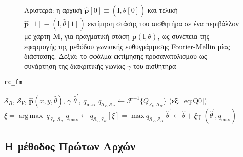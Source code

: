 \begin{figure}[h]\centering
  \vspace{0.5cm}
  
  \vspace{0.5cm}
  \caption{\small Αριστερά: η αρχική
           $\hat{\bm{p}}[0] \equiv (\bm{l},\hat{\theta}[0])$ και τελική
           $\hat{\bm{p}}[1] \equiv (\bm{l},\hat{\theta}[1])$ εκτίμηση στάσης του
           αισθητήρα σε ένα περιβάλλον με χάρτη $\bm{M}$, για πραγματική στάση
           $\bm{p}(\bm{l},\theta)$, ως συνέπεια της εφαρμογής της μεθόδου
           γωνιακής ευθυγράμμισης Fourier-Mellin μίας διάστασης. Δεξιά: το
           σφάλμα εκτίμησης προσανατολισμού ως συνάρτηση της διακριτικής γωνίας
           $\gamma$ του αισθητήρα}
  \label{fig:02_04_02:rc_fm}
\end{figure}

\begin{algorithm}
  \caption{\texttt{rc\_fm}}
  \begin{spacing}{1.3}
  \begin{algorithmic}[1]
    \REQUIRE $\mathcal{S}_R$, $\mathcal{S}_V$, $\hat{\bm{p}}(x, y, \hat{\theta})$, $\gamma$
    \ENSURE $\hat{\theta}^\prime$, $q_{\max}$
    \STATE $q_{\mathcal{S}_V, \mathcal{S}_R} \leftarrow \mathcal{F}^{-1}\{Q_{\mathcal{S}_V, \mathcal{S}_R}\}$ (εξ. \ref{eq:Q0})
    \STATE $\xi = \operatorname*{arg\,max} \ q_{\mathcal{S}_V, \mathcal{S}_R}$
    \STATE $q_{\max} \leftarrow q_{\mathcal{S}_V, \mathcal{S}_R}[\xi] = \max q_{\mathcal{S}_V, \mathcal{S}_R}$
    \STATE $\hat{\theta}^\prime \leftarrow \hat{\theta} + \xi \gamma$
    \RETURN $(\hat{\theta}^\prime, q_{\max})$
  \end{algorithmic}
  \end{spacing}
  \label{alg:algorithm_fmrc}
\end{algorithm}


\subsection{Η μέθοδος Πρώτων Αρχών}
\label{subsection:02_04_02:02}

